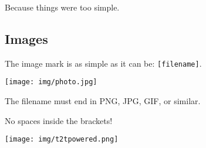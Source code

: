 \documentclass{article}
\begin{document}
Because things were too simple.

\subsection*{Images}

The image mark is as simple as it can be: \texttt{[filename]}.

\texttt{[image: img/photo.jpg]}

\begin{compactitem}
\item The filename must end in PNG, JPG, GIF, or similar.
\item No spaces inside the brackets!
\end{compactitem}

\hrulefill{}

\texttt{[image: img/t2tpowered.png]}
\end{document}
